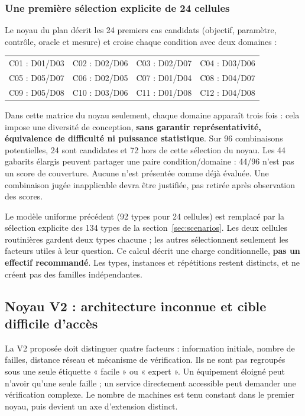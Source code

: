 \documentclass[11pt,a4paper]{article}
\newcommand{\code}[1]{{\small\ttfamily\path{#1}}}
\begin{document}
\normalsize

\subsubsection{Une première sélection explicite de 24 cellules}
Le noyau \code{cells} du plan \code{coverage-plan.json} décrit les 24 premiers cas candidats (objectif, paramètre, contrôle, oracle et mesure) et croise chaque condition avec deux domaines :
\begin{center}\small
\begin{tabular}{@{}llll@{}}\toprule
C01 : D01/D03 & C02 : D02/D06 & C03 : D02/D07 & C04 : D03/D06\\
C05 : D05/D07 & C06 : D02/D05 & C07 : D01/D04 & C08 : D04/D07\\
C09 : D05/D08 & C10 : D03/D06 & C11 : D01/D08 & C12 : D04/D08\\\bottomrule
\end{tabular}
\end{center}
Dans cette matrice du noyau seulement, chaque domaine apparaît trois fois : cela impose une diversité de conception, \textbf{sans garantir représentativité, équivalence de difficulté ni puissance statistique}. Sur 96 combinaisons potentielles, 24 sont candidates et 72 hors de cette sélection du noyau. Les 44 gabarits élargis peuvent partager une paire condition/domaine : 44/96 n'est pas un score de couverture. Aucune n'est présentée comme déjà évaluée. Une combinaison jugée inapplicable devra être justifiée, pas retirée après observation des scores.

Le modèle uniforme précédent (92 types pour 24 cellules) est remplacé par la sélection explicite des 134 types de la section~\ref{sec:scenarios}. Les deux cellules routinières gardent deux types chacune ; les autres sélectionnent seulement les facteurs utiles à leur question. Ce calcul décrit une charge conditionnelle, \textbf{pas un effectif recommandé}. Les types, instances et répétitions restent distincts, et ne créent pas des familles indépendantes.


\subsection{Noyau V2 : architecture inconnue et cible difficile d'accès}
\label{sec:v2}
La V2 proposée doit distinguer quatre facteurs : information initiale, nombre de failles, distance réseau et mécanisme de vérification. Ils ne sont pas regroupés sous une seule étiquette « facile » ou « expert ». Un équipement éloigné peut n'avoir qu'une seule faille ; un service directement accessible peut demander une vérification complexe. Le nombre de machines est tenu constant dans le premier noyau, puis devient un axe d'extension distinct.
\end{document}
